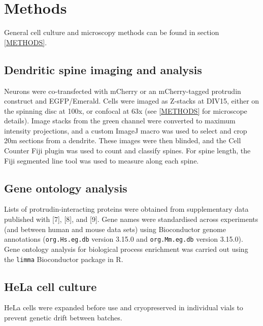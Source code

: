 \documentclass[
  12pt,
  a4paper,
]{book}
\begin{document}
\hypertarget{methods-1}{%
\section{Methods}\label{methods-1}}

General cell culture and microscopy methods can be found in section \ref{METHODS}.

\hypertarget{dendritic-spine-imaging-and-analysis}{%
\subsection{Dendritic spine imaging and analysis}\label{dendritic-spine-imaging-and-analysis}}

Neurons were co-transfected with mCherry or an mCherry-tagged protrudin construct and EGFP/Emerald. Cells were imaged as Z-stacks at DIV15, either on the spinning disc at 100x, or confocal at 63x (see \ref{METHODS} for microscope details). Image stacks from the green channel were converted to maximum intensity projections, and a custom ImageJ macro was used to select and crop 20\textmu{}m sections from a dendrite. These images were then blinded, and the Cell Counter Fiji plugin was used to count and classify spines. For spine length, the Fiji segmented line tool was used to measure along each spine.

\hypertarget{gene-ontology-analysis}{%
\subsection{Gene ontology analysis}\label{gene-ontology-analysis}}

Lists of protrudin-interacting proteins were obtained from supplementary data published with {[}7{]}, {[}8{]}, and {[}9{]}. Gene names were standardised across experiments (and between human and mouse data sets) using Bioconductor genome annotations (\texttt{org.Hs.eg.db} version 3.15.0 and \texttt{org.Mm.eg.db} version 3.15.0). Gene ontology analysis for biological process enrichment was carried out using the \texttt{limma} Bioconductor package in R.

\hypertarget{hela-cell-culture}{%
\subsection{HeLa cell culture}\label{hela-cell-culture}}

HeLa cells were expanded before use and cryopreserved in individual vials to prevent genetic drift between batches.
\end{document}
